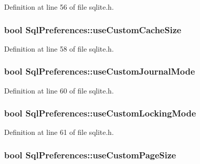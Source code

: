 \-Definition at line 56 of file sqlite.\-h.

\hypertarget{structSqlPreferences_ad26f9920ddc5ac5f655873d9ecb3ac53}{
\subsubsection[{use\-Custom\-Cache\-Size}]{\setlength{\rightskip}{0pt plus 5cm}bool {\bf \-Sql\-Preferences\-::use\-Custom\-Cache\-Size}}}\label{structSqlPreferences_ad26f9920ddc5ac5f655873d9ecb3ac53}


\-Definition at line 58 of file sqlite.\-h.

\hypertarget{structSqlPreferences_a9aa98cdd591864c7b2382b2d0fff0de9}{
\subsubsection[{use\-Custom\-Journal\-Mode}]{\setlength{\rightskip}{0pt plus 5cm}bool {\bf \-Sql\-Preferences\-::use\-Custom\-Journal\-Mode}}}\label{structSqlPreferences_a9aa98cdd591864c7b2382b2d0fff0de9}


\-Definition at line 60 of file sqlite.\-h.

\hypertarget{structSqlPreferences_a22c08a63c97db2f85e08920bf3e22516}{
\subsubsection[{use\-Custom\-Locking\-Mode}]{\setlength{\rightskip}{0pt plus 5cm}bool {\bf \-Sql\-Preferences\-::use\-Custom\-Locking\-Mode}}}\label{structSqlPreferences_a22c08a63c97db2f85e08920bf3e22516}


\-Definition at line 61 of file sqlite.\-h.

\hypertarget{structSqlPreferences_a7e53d4abaf46acfb84cd8c30fbf3b1df}{
\subsubsection[{use\-Custom\-Page\-Size}]{\setlength{\rightskip}{0pt plus 5cm}bool {\bf \-Sql\-Preferences\-::use\-Custom\-Page\-Size}}}\label{structSqlPreferences_a7e53d4abaf46acfb84cd8c30fbf3b1df}


